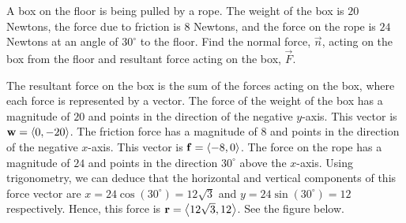 \documentclass[handout]{ximera}
\begin{document}
\begin{example}[Example 6]
A box on the floor is being pulled by a rope. The weight of the box is $20$ Newtons, the force due to friction is $8$ Newtons, and the 
force on the rope is $24$ Newtons at an angle of $30^\circ$ to the floor. Find the normal force, $\vec{n}$, acting on the box from the 
floor and resultant force acting on the box, $\vec{F}$.\\
\begin{image}  
\end{image}


The resultant force on the box is the sum of the forces acting on the box, where each force is represented by a vector.
The force of the weight of the box has a magnitude of $20$ and points in the direction of the negative $y$-axis.  
This vector is $\mathbf{w} = \left\langle 0,-20\right\rangle$.
The friction force has a magnitude of $8$ and points in the direction of the negative $x$-axis.  This vector is $\mathbf{f} = \left\langle -8,0\right\rangle$.
The force on the rope has a magnitude of $24$ and points in the direction $30^\circ$ above the $x$-axis. 
Using trigonometry, we can deduce that the horizontal and vertical components of this force vector are $x = 24\cos(30^\circ) = 12\sqrt 3$
and $y = 24\sin(30^\circ) = 12$ respectively. Hence, this force is $\mathbf r = \left\langle 12\sqrt 3, 12\right\rangle$.  See the figure below.

\begin{image}
\end{image}


\end{example}
\end{document}
